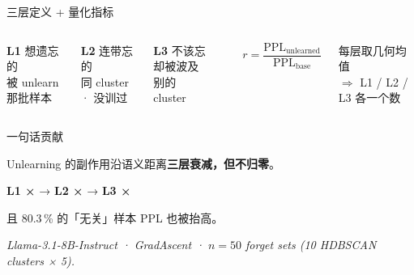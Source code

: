 \documentclass[aspectratio=169,10pt]{beamer}
\begin{document}
\begin{frame}{三层定义 + 量化指标}
    \begin{columns}[T,onlytextwidth]
    \centering

    \small
    \textbf{L1} 想遗忘的\\ \footnotesize 被 unlearn 那批样本

    \vspace{0.4em}
    \small
    \textbf{L2} 连带忘的\\ \footnotesize 同 cluster · 没训过

    \vspace{0.4em}
    \small
    \textbf{L3} 不该忘却被波及\\ \footnotesize 别的 cluster

    \vspace{0.8em}
    \hrule

    \vspace{0.6em}
    \centering
    $r = \dfrac{\text{PPL}_\text{unlearned}}{\text{PPL}_\text{base}}$

    \vspace{0.4em}
    \footnotesize
    每层取几何均值\\ $\Rightarrow$ L1 / L2 / L3 各一个数
    \end{columns}
\end{frame}

\begin{frame}{一句话贡献}
    \begin{center}
        \large
        Unlearning 的副作用沿语义距离\textbf{三层衰减，但不归零}。
    \end{center}

    \vspace{0.8em}
    \begin{center}
        \Large
        \textbf{L1 ×} \;→\; \textbf{L2 ×} \;→\; \textbf{L3 ×}
    \end{center}

    \vspace{0.8em}
    \begin{center}
        \normalsize
        且 \alert{80.3\,\%} 的「无关」样本 PPL 也被抬高。
    \end{center}

    \vfill
    \footnotesize\itshape\centering
    Llama-3.1-8B-Instruct · GradAscent · $n=50$ forget sets (10 HDBSCAN clusters × 5).
\end{frame}
\end{document}
